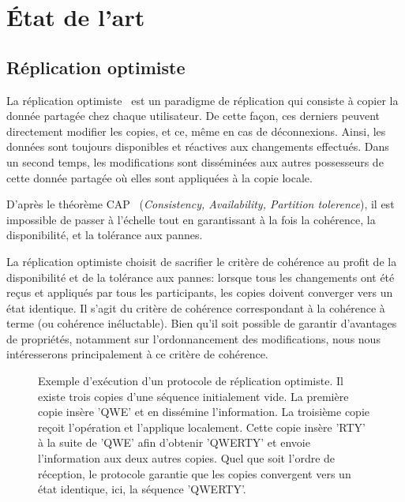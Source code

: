 
\section{État de l'art}

\subsection{Réplication optimiste}

La réplication optimiste~\cite{demers1987epidemic, saito2005optimistic} est un
paradigme de réplication qui consiste à copier la donnée partagée chez chaque
utilisateur. De cette façon, ces derniers peuvent directement modifier les
copies, et ce, même en cas de déconnexions.  Ainsi, les données sont toujours
disponibles et réactives aux changements effectués. Dans un second temps, les
modifications sont disséminées aux autres possesseurs de cette donnée partagée
où elles sont appliquées à la copie locale.

D'après le théorème CAP~\cite{gilbert2002brewer} (\emph{Consistency,
  Availability, Partition tolerence}), il est impossible de passer à l'échelle
tout en garantissant à la fois la cohérence, la disponibilité, et la tolérance
aux pannes. 


La réplication optimiste choisit de sacrifier le critère de cohérence au profit
de la disponibilité et de la tolérance aux pannes: lorsque tous les changements
ont été reçus et appliqués par tous les participants, les copies doivent
converger vers un état identique. Il s'agit du critère de cohérence
correspondant à la cohérence à terme (ou cohérence inéluctable). Bien qu'il soit
possible de garantir d'avantages de propriétés, notamment sur l'ordonnancement
des modifications, nous nous intéresserons principalement à ce critère de
cohérence.

\begin{figure}
  \centering
  
  \caption{\label{fig:lseq:optimisticexample}Exemple d'exécution d'un protocole
    de réplication optimiste. Il existe trois copies d'une séquence initialement
    vide. La première copie insère 'QWE' et en dissémine l'information. La
    troisième copie reçoit l'opération et l'applique localement. Cette copie
    insère 'RTY' à la suite de 'QWE' afin d'obtenir 'QWERTY' et envoie
    l'information aux deux autres copies. Quel que soit l'ordre de réception, le
    protocole garantie que les copies convergent vers un état identique, ici, la
    séquence 'QWERTY'.}
\end{figure}

